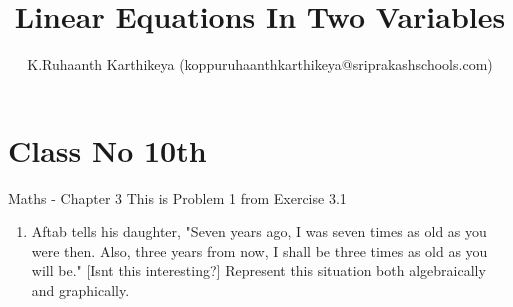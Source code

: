 \documentclass[12pt]{article}
\title{Linear Equations In Two Variables}
\author{K.Ruhaanth Karthikeya (koppuruhaanthkarthikeya@sriprakashschools.com)}
\begin{document}
\maketitle
\section*{Class No 10th} { Maths - Chapter 3}
This is Problem 1 from Exercise 3.1
\begin{enumerate}
\item Aftab tells his daughter, "Seven years ago,
I was seven times as old as you were then. Also, three years from 
now, I shall be three times as old as you will be." [Isnt this interesting?] Represent this situation both algebraically and graphically.


\end{enumerate}
\end{document}
